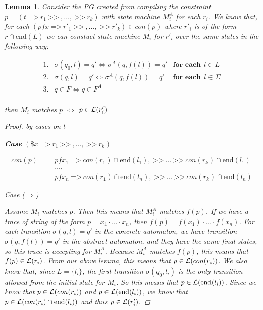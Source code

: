 \documentclass[twocolumn]{sig-alternate-10pt}
\newcommand{\Prefer}{\texttt{>>}}
\newcommand{\Path}{\texttt{=>}}
\newtheorem{lem}[thm]{Lemma}
\begin{document}
\begin{lem}
  Consider the PG created from compiling the constraint $p = (t ~\Path~ r_1 ~\Prefer~,\dots, ~\Prefer~ r_k)$ with state machine $M^A_i$ for each $r_i$. We know that, for each $(pfx ~\Path~ r'_1 ~\Prefer~,\dots, ~\Prefer~ r'_k) \in con(p)$ where $r'_i$ is of the form $r \cap \text{end}(L)$ we can constuct state machine $M_i$ for $r'_i$ over the same states in the following way:
    
    \[ \begin{array}{lll}
      1. & \sigma(q_0,l) = q' \iff \sigma^A(q,f(l)) = q' & \textbf{for each}~~ l \in L \\
      2. & \sigma(q,l) = q' \iff \sigma^A(q,f(l)) = q' & \textbf{for each}~~ l \in \Sigma \\
      3. & q \in F \iff q \in F^A & \\
    \end{array} \]

  then $M_i$ matches $p$ $\iff$ $p \in \mathcal{L}(r_i')$
  
  \vspace{1em}
  \begin{proof} by cases on $t$

    \vspace{1em}

    \textbf{Case} $(\$x ~\Path~ r_1 ~\Prefer~,\dots, ~\Prefer~ r_k)$

    \[ \begin{array}{lcl}
      con(p) &=& pfx_1 ~\Path~ con(r_1) \cap \text{end}(l_1), ~\Prefer~ \dots ~\Prefer~ con(r_k) \cap \text{end}(l_1)  \\
             & & \dots, \\
             & & pfx_n ~\Path~ con(r_1) \cap \text{end}(l_n), ~\Prefer~ \dots ~\Prefer~ con(r_k) \cap \text{end}(l_n)
    \end{array} \]

    Case ($\Rightarrow$)

    Assume $M_i$ matches $p$. Then this means that $M^A_i$ matches $f(p)$. If we have a trace of string of the form $ p = x_1 \cdot \dots \cdot x_n$, then $f(p) = f(x_1) \cdot \dots \cdot f(x_n)$. For each transition $\sigma(q,l) = q'$ in the concrete automaton, we have transition $\sigma(q,f(l)) = q'$ in the abstract automaton, and they have the same final states, so this trace is accepting for $M^A_i$. Because $M^A_i$ matches $f(p)$, this means that $f(p) \in \mathcal{L}(r_i)$. From our above lemma, this means that $p \in \mathcal{L}(con(r_i))$. We also know that, since $L = \{ l_i \}$, the first transition $\sigma(q_0,l_i)$ is the only transition allowed from the initial state for $M_i$. So this means that $p \in \mathcal{L}(\text{end}(l_i))$. Since we know that $p \in \mathcal{L}(con(r_i))$ and $p \in \mathcal{L}(\text{end}(l_i))$, we know that $p \in \mathcal{L}(con(r_i) \cap \text{end}(l_i))$ and thus $p \in \mathcal{L}(r'_i)$.


\end{proof}
\end{lem}
\end{document}
